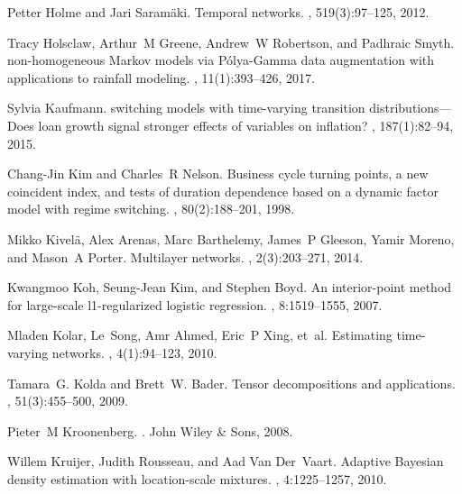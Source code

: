 \documentclass[12pt,a4paper]{article}
\theoremstyle{custom}
\begin{document}
\begin{thebibliography}{10}
Petter Holme and Jari Saram{\"a}ki.
\newblock Temporal networks.
, 519(3):97--125, 2012.

Tracy Holsclaw, Arthur~M Greene, Andrew~W Robertson, and Padhraic Smyth.
 non-homogeneous {Markov} models via {P{\'o}lya-Gamma} data
  augmentation with applications to rainfall modeling.
, 11(1):393--426, 2017.

Sylvia Kaufmann.
 switching models with time-varying transition
  distributions---{Does} loan growth signal stronger effects of variables on
  inflation?
, 187(1):82--94, 2015.

Chang-Jin Kim and Charles~R Nelson.
\newblock Business cycle turning points, a new coincident index, and tests of
  duration dependence based on a dynamic factor model with regime switching.
, 80(2):188--201, 1998.

Mikko Kivel{\"a}, Alex Arenas, Marc Barthelemy, James~P Gleeson, Yamir Moreno,
  and Mason~A Porter.
\newblock Multilayer networks.
, 2(3):203--271, 2014.

Kwangmoo Koh, Seung-Jean Kim, and Stephen Boyd.
\newblock An interior-point method for large-scale l1-regularized logistic
  regression.
, 8:1519--1555, 2007.

Mladen Kolar, Le~Song, Amr Ahmed, Eric~P Xing, et~al.
\newblock Estimating time-varying networks.
, 4(1):94--123, 2010.

Tamara~G. Kolda and Brett~W. Bader.
\newblock Tensor decompositions and applications.
, 51(3):455--500, 2009.

Pieter~M Kroonenberg.
.
\newblock John Wiley \& Sons, 2008.

Willem Kruijer, Judith Rousseau, and Aad Van Der~Vaart.
\newblock Adaptive {Bayesian} density estimation with location-scale mixtures.
, 4:1225--1257, 2010.


\end{thebibliography}
\end{document}
